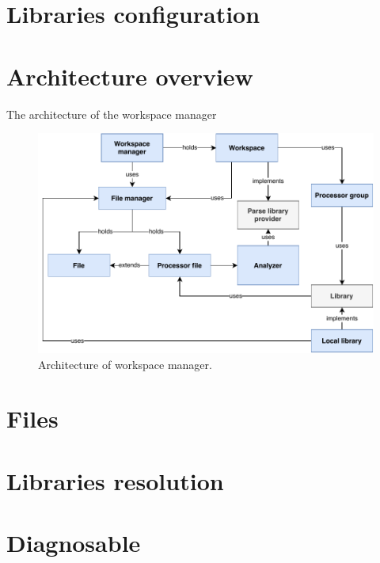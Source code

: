 \section{Libraries configuration}

\section{Architecture overview}

The architecture of the workspace manager

\begin{landscape}
\begin{figure}
	\centering
	\includegraphics[width=16cm]{img/ws_mngr_arch}
	\caption{Architecture of workspace manager.}
	\label{ws_mngr_arch}
\end{figure}
\end{landscape}


\section{Files}




\section{Libraries resolution}

\section{Diagnosable}